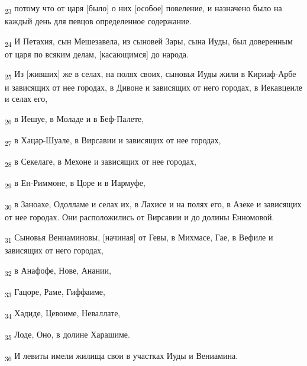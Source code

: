 \begin{tcolorbox}
\textsubscript{23} потому что от царя [было] о них [особое] повеление, и назначено было на каждый день для певцов определенное содержание.
\end{tcolorbox}
\begin{tcolorbox}
\textsubscript{24} И Петахия, сын Мешезавела, из сыновей Зары, сына Иуды, был доверенным от царя по всяким делам, [касающимся] до народа.
\end{tcolorbox}
\begin{tcolorbox}
\textsubscript{25} Из [живших] же в селах, на полях своих, сыновья Иуды жили в Кириаф-Арбе и зависящих от нее городах, в Дивоне и зависящих от него городах, в Иекавцеиле и селах его,
\end{tcolorbox}
\begin{tcolorbox}
\textsubscript{26} в Иешуе, в Моладе и в Беф-Палете,
\end{tcolorbox}
\begin{tcolorbox}
\textsubscript{27} в Хацар-Шуале, в Вирсавии и зависящих от нее городах,
\end{tcolorbox}
\begin{tcolorbox}
\textsubscript{28} в Секелаге, в Мехоне и зависящих от нее городах,
\end{tcolorbox}
\begin{tcolorbox}
\textsubscript{29} в Ен-Риммоне, в Цоре и в Иармуфе,
\end{tcolorbox}
\begin{tcolorbox}
\textsubscript{30} в Заноахе, Одолламе и селах их, в Лахисе и на полях его, в Азеке и зависящих от нее городах. Они расположились от Вирсавии и до долины Енномовой.
\end{tcolorbox}
\begin{tcolorbox}
\textsubscript{31} Сыновья Вениаминовы, [начиная] от Гевы, в Михмасе, Гае, в Вефиле и зависящих от него городах,
\end{tcolorbox}
\begin{tcolorbox}
\textsubscript{32} в Анафофе, Нове, Анании,
\end{tcolorbox}
\begin{tcolorbox}
\textsubscript{33} Гацоре, Раме, Гиффаиме,
\end{tcolorbox}
\begin{tcolorbox}
\textsubscript{34} Хадиде, Цевоиме, Неваллате,
\end{tcolorbox}
\begin{tcolorbox}
\textsubscript{35} Лоде, Оно, в долине Харашиме.
\end{tcolorbox}
\begin{tcolorbox}
\textsubscript{36} И левиты имели жилища свои в участках Иуды и Вениамина.
\end{tcolorbox}
